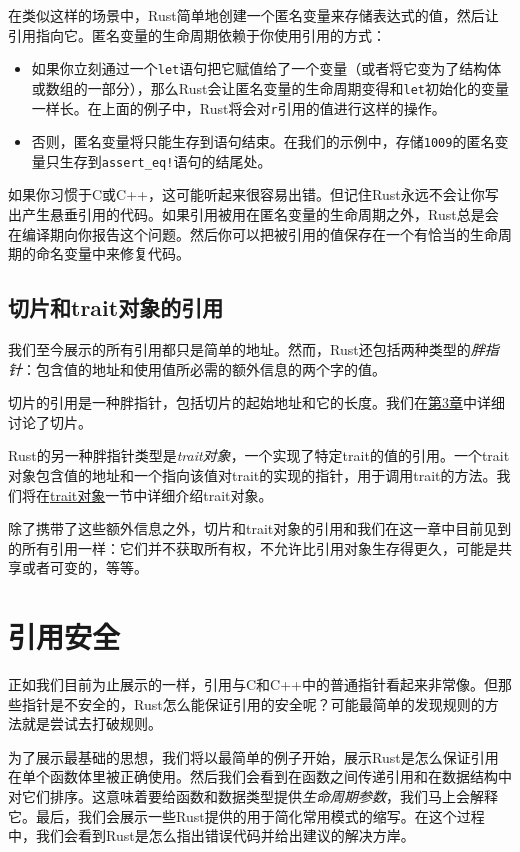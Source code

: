 在类似这样的场景中，Rust简单地创建一个匿名变量来存储表达式的值，然后让引用指向它。匿名变量的生命周期依赖于你使用引用的方式：
\begin{itemize}
    \item 如果你立刻通过一个\texttt{let}语句把它赋值给了一个变量（或者将它变为了结构体或数组的一部分），那么Rust会让匿名变量的生命周期变得和\texttt{let}初始化的变量一样长。在上面的例子中，Rust将会对\texttt{r}引用的值进行这样的操作。
    \item 否则，匿名变量将只能生存到语句结束。在我们的示例中，存储\texttt{1009}的匿名变量只生存到\texttt{assert\_eq!}语句的结尾处。
\end{itemize}

如果你习惯于C或C++，这可能听起来很容易出错。但记住Rust永远不会让你写出产生悬垂引用的代码。如果引用被用在匿名变量的生命周期之外，Rust总是会在编译期向你报告这个问题。然后你可以把被引用的值保存在一个有恰当的生命周期的命名变量中来修复代码。

\subsection{切片和trait对象的引用}
我们至今展示的所有引用都只是简单的地址。然而，Rust还包括两种类型的\emph{胖指针}：包含值的地址和使用值所必需的额外信息的两个字的值。

切片的引用是一种胖指针，包括切片的起始地址和它的长度。我们在\hyperref[ch03]{第3章}中详细讨论了切片。

Rust的另一种胖指针类型是\emph{trait对象}，一个实现了特定trait的值的引用。一个trait对象包含值的地址和一个指向该值对trait的实现的指针，用于调用trait的方法。我们将在\hyperref[traitobject]{trait对象}一节中详细介绍trait对象。

除了携带了这些额外信息之外，切片和trait对象的引用和我们在这一章中目前见到的所有引用一样：它们并不获取所有权，不允许比引用对象生存得更久，可能是共享或者可变的，等等。

\section{引用安全}

正如我们目前为止展示的一样，引用与C和C++中的普通指针看起来非常像。但那些指针是不安全的，Rust怎么能保证引用的安全呢？可能最简单的发现规则的方法就是尝试去打破规则。

为了展示最基础的思想，我们将以最简单的例子开始，展示Rust是怎么保证引用在单个函数体里被正确使用。然后我们会看到在函数之间传递引用和在数据结构中对它们排序。这意味着要给函数和数据类型提供\emph{生命周期参数}，我们马上会解释它。最后，我们会展示一些Rust提供的用于简化常用模式的缩写。在这个过程中，我们会看到Rust是怎么指出错误代码并给出建议的解决方岸。

